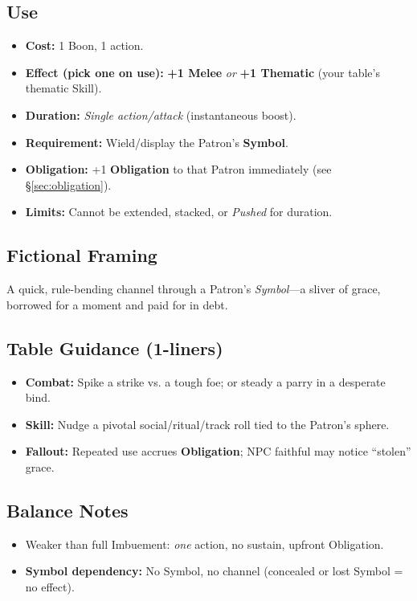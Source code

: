 \subsection*{Use}
\begin{itemize}
  \item \textbf{Cost:} 1 Boon, 1 action.
  \item \textbf{Effect (pick one on use):} \textbf{+1 Melee} \emph{or} \textbf{+1 Thematic} (your table’s thematic Skill).
  \item \textbf{Duration:} \textit{Single action/attack} (instantaneous boost).
  \item \textbf{Requirement:} Wield/display the Patron’s \textbf{Symbol}.
  \item \textbf{Obligation:} +1 \textbf{Obligation} to that Patron immediately (see \S\ref{sec:obligation}).
  \item \textbf{Limits:} Cannot be extended, stacked, or \emph{Pushed} for duration.
\end{itemize}

\subsection*{Fictional Framing}
A quick, rule-bending channel through a Patron’s \emph{Symbol}—a sliver of grace, borrowed for a moment and paid for in debt.

\subsection*{Table Guidance (1-liners)}
\begin{itemize}
  \item \textbf{Combat:} Spike a strike vs. a tough foe; or steady a parry in a desperate bind.
  \item \textbf{Skill:} Nudge a pivotal social/ritual/track roll tied to the Patron’s sphere.
  \item \textbf{Fallout:} Repeated use accrues \textbf{Obligation}; NPC faithful may notice “stolen” grace.
\end{itemize}

\subsection*{Balance Notes}
\begin{itemize}
  \item Weaker than full Imbuement: \emph{one} action, no sustain, upfront Obligation.
  \item \textbf{Symbol dependency:} No Symbol, no channel (concealed or lost Symbol = no effect).
\end{itemize}

